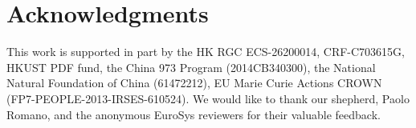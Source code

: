 \section*{Acknowledgments}
This work is supported in part by the HK RGC ECS-26200014, CRF-C703615G, HKUST PDF fund, the China 973 Program (2014CB340300), the National Natural Foundation of China (61472212), EU Marie Curie Actions CROWN (FP7-PEOPLE-2013-IRSES-610524).
We would like to thank our shepherd, Paolo Romano, and the anonymous EuroSys reviewers for their valuable feedback.

